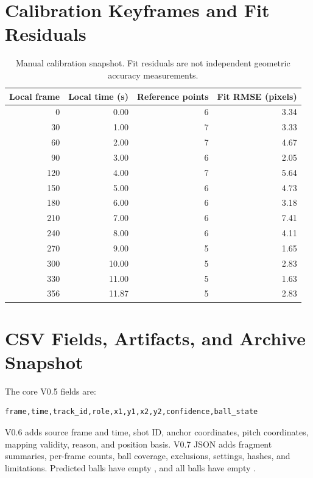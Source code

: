 \documentclass[11pt,a4paper]{article}
\newcommand{\code}[1]{\texttt{\detokenize{#1}}}
\begin{document}
\section{Calibration Keyframes and Fit Residuals}

\begin{table}[htbp]
\centering
\caption{Manual calibration snapshot. Fit residuals are not independent
geometric accuracy measurements.}
\small
\begin{tabular}{rrrr}
\toprule
Local frame & Local time (s) & Reference points & Fit RMSE (pixels)\\
\midrule
0   & 0.00  & 6 & 3.34\\
30  & 1.00  & 7 & 3.33\\
60  & 2.00  & 7 & 4.67\\
90  & 3.00  & 6 & 2.05\\
120 & 4.00  & 7 & 5.64\\
150 & 5.00  & 6 & 4.73\\
180 & 6.00  & 6 & 3.18\\
210 & 7.00  & 6 & 7.41\\
240 & 8.00  & 6 & 4.11\\
270 & 9.00  & 5 & 1.65\\
300 & 10.00 & 5 & 2.83\\
330 & 11.00 & 5 & 1.63\\
356 & 11.87 & 5 & 2.83\\
\bottomrule
\end{tabular}
\end{table}

\section{CSV Fields, Artifacts, and Archive Snapshot}

The core V0.5 fields are:
\begin{lstlisting}
frame,time,track_id,role,x1,y1,x2,y2,confidence,ball_state
\end{lstlisting}
V0.6 adds source frame and time, shot ID, anchor coordinates, pitch coordinates,
mapping validity, reason, and position basis.
V0.7 JSON adds fragment summaries, per-frame counts, ball coverage, exclusions,
settings, hashes, and limitations.
Predicted balls have empty \code{confidence}, and all balls have empty
\code{track_id}.
\end{document}
